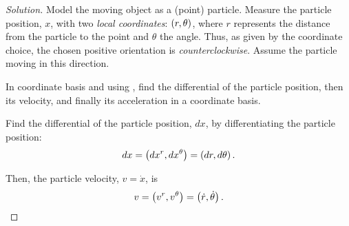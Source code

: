 \documentclass[aps,pra,10pt,a4paper]{revtex4-1}
\theoremstyle{plain}
\theoremstyle{definition}
\theoremstyle{remark}
\newenvironment{solution}{\begin{proof}[Solution]}{\end{proof}}
\providecommand*{\lingo}[1]{\textsl{#1}}
\providecommand*{\pos}{x} %
\providecommand*{\vel}{v} %
\providecommand*{\dt}[1]{\dot{#1}}          %
\providecommand*{\cvec}[2]{\tensor{#1}{^{#2}}} %
\providecommand*{\pxpos}{r}      %
\providecommand*{\pypos}{\theta} %
\providecommand*{\parens}[1]{\mleft({#1}\mright)}               %
\providecommand*{\tuple}[1]{\parens{#1}}                        %
\begin{document}
\begin{solution}
  Model the moving object as a (point) particle. Measure the particle position, $\pos$, with two \emph{local coordinates}: $\tuple{\pxpos, \pypos}$, where $\pxpos$ represents the distance from the particle to the point and $\pypos$ the angle. Thus, as given by the coordinate choice, the chosen positive orientation is \lingo{counterclockwise}. Assume the particle moving in this direction.

In coordinate basis and using , find the differential of the particle position, then its velocity, and finally its acceleration in a coordinate basis.

Find the differential of the particle position, $d\pos$, by differentiating the particle position:
%
\begin{equation*}
  d\pos = \tuple{d\cvec\pos\pxpos, d\cvec\pos\pypos} 
        = \tuple{d\pxpos, d\pypos}\,.
\end{equation*}

Then, the particle velocity, $\vel = \dt\pos$, is
%
\begin{equation*}
  \vel = \tuple{\cvec\vel\pxpos, \cvec\vel\pypos}
       = \tuple{\dt\pxpos, \dt\pypos}\,.
\end{equation*}


\end{solution}
\end{document}
